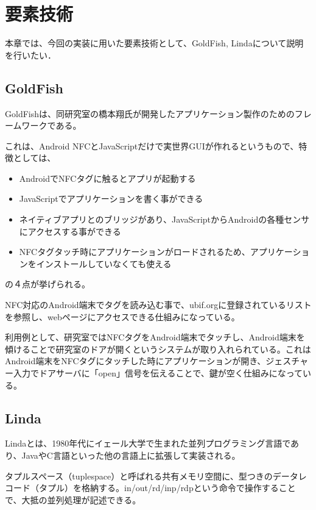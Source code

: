 \chapter{要素技術}
\label{chap:04}

本章では、今回の実装に用いた要素技術として、GoldFish, Lindaについて説明を行いたい．

\section{GoldFish}

GoldFishは、同研究室の橋本翔氏が開発したアプリケーション製作のためのフレームワークである。

これは、Android NFCとJavaScriptだけで実世界GUIが作れるというもので、特徴としては、

\begin{itemize}
   \item AndroidでNFCタグに触るとアプリが起動する
   \item JavaScriptでアプリケーションを書く事ができる
   \item ネイティブアプリとのブリッジがあり、JavaScriptからAndroidの各種センサにアクセスする事ができる
    \item NFCタグタッチ時にアプリケーションがロードされるため、アプリケーションをインストールしていなくても使える
 \end{itemize}
 
の４点が挙げられる。


NFC対応のAndroid端末でタグを読み込む事で、ubif.orgに登録されているリストを参照し、webページにアクセスできる仕組みになっている。

利用例として、研究室ではNFCタグをAndroid端末でタッチし、Android端末を傾けることで研究室のドアが開くというシステムが取り入れられている。これはAndroid端末をNFCタグにタッチした時にアプリケーションが開き、ジェスチャー入力でドアサーバに「open」信号を伝えることで、鍵が空く仕組みになっている。


\section{Linda}

Lindaとは、1980年代にイェール大学で生まれた並列プログラミング言語であり、JavaやC言語といった他の言語上に拡張して実装される。

タプルスペース（tuplespace）と呼ばれる共有メモリ空間に、型つきのデータレコード（タプル）を格納する。in/out/rd/inp/rdpという命令で操作することで、大抵の並列処理が記述できる。


